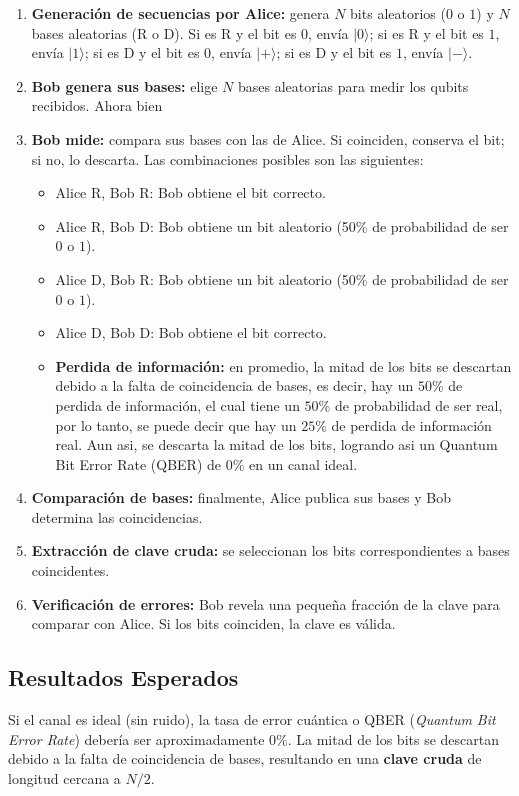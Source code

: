 \documentclass[12pt]{article}
\begin{document}
\begin{enumerate}
    \item \textbf{Generación de secuencias por Alice:} genera $N$ bits aleatorios ($0$ o $1$) y $N$ bases aleatorias (R o D). Si es R y el bit es $0$, envía $|0\rangle$; si es R y el bit es $1$, envía $|1\rangle$; si es D y el bit es $0$, envía $|+\rangle$; si es D y el bit es $1$, envía $|-\rangle$.
    \item \textbf{Bob genera sus bases:} elige $N$ bases aleatorias para medir los qubits recibidos. Ahora bien
    \item \textbf{Bob mide:} compara sus bases con las de Alice. Si coinciden, conserva el bit; si no, lo descarta. Las combinaciones posibles son las siguientes:
    \begin{itemize}
        \item Alice R, Bob R: Bob obtiene el bit correcto.
        \item Alice R, Bob D: Bob obtiene un bit aleatorio (50\% de probabilidad de ser $0$ o $1$).
        \item Alice D, Bob R: Bob obtiene un bit aleatorio (50\% de probabilidad de ser $0$ o $1$).
        \item Alice D, Bob D: Bob obtiene el bit correcto.
        \item \textbf{Perdida de información:} en promedio, la mitad de los bits se descartan debido a la falta de coincidencia de bases, es decir, hay un $50\%$ de perdida de información, el cual tiene un $50\%$ de probabilidad de ser real, por lo tanto, se puede decir que hay un $25\%$ de perdida de información real. Aun asi, se descarta la mitad de los bits, logrando asi un Quantum Bit Error Rate (QBER) de $0\%$ en un canal ideal.
    \end{itemize}
    \item \textbf{Comparación de bases:} finalmente, Alice publica sus bases y Bob determina las coincidencias.
    \item \textbf{Extracción de clave cruda:} se seleccionan los bits correspondientes a bases coincidentes.
    \item \textbf{Verificación de errores:} Bob revela una pequeña fracción de la clave para comparar con Alice. Si los bits coinciden, la clave es válida.
\end{enumerate}

\subsection{Resultados Esperados}
Si el canal es ideal (sin ruido), la tasa de error cuántica o QBER (\textit{Quantum Bit Error Rate}) debería ser aproximadamente $0\%$.
La mitad de los bits se descartan debido a la falta de coincidencia de bases, resultando en una \textbf{clave cruda} de longitud cercana a $N/2$.
\end{document}

